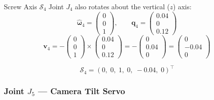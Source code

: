 \documentclass[12pt,a4paper]{article}
\newcommand{\vect}[1]{\bm{#1}}
\begin{document}
\begin{mathbox}{Screw Axis $\mathcal{S}_4$}
Joint $J_4$ also rotates about the vertical ($z$) axis:
\[
  \vect{\hat\omega}_4 = \begin{pmatrix}0\\0\\1\end{pmatrix}, \qquad
  \vect{q}_4 = \begin{pmatrix}0.04\\0\\0.12\end{pmatrix}
\]
\[
  \vect{v}_4
  = -\begin{pmatrix}0\\0\\1\end{pmatrix} \times \begin{pmatrix}0.04\\0\\0.12\end{pmatrix}
  = -\begin{pmatrix}0\\0.04\\0\end{pmatrix}
  = \begin{pmatrix}0\\-0.04\\0\end{pmatrix}
\]
\end{mathbox}
\[
  \boxed{\mathcal{S}_4 = (0,\;0,\;1,\;0,\;-0.04,\;0)^\top}
\]

\subsubsection{Joint $J_5$ --- Camera Tilt Servo}
\end{document}
